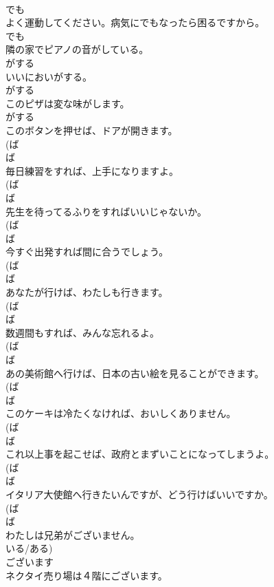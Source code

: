 \documentclass[8pt]{extreport}
\begin{document}
\begin{CJK}{UTF8}{min}
\\	でも
\\	よく運動してください。病気にでもなったら困るですから。	
\\	でも
\\	隣の家でピアノの音がしている。	
\\	がする
\\	いいにおいがする。	
\\	がする
\\	このピザは変な味がします。	
\\	がする
\\	このボタンを押せば、ドアが開きます。	
\\	(ば 
\\	ば
\\	毎日練習をすれば、上手になりますよ。	
\\	(ば 
\\	ば
\\	先生を待ってるふりをすればいいじゃないか。	
\\	(ば 
\\	ば
\\	今すぐ出発すれば間に合うでしょう。	
\\	(ば 
\\	ば
\\	あなたが行けば、わたしも行きます。	
\\	(ば 
\\	ば
\\	数週間もすれば、みんな忘れるよ。	
\\	(ば 
\\	ば
\\	あの美術館へ行けば、日本の古い絵を見ることができます。	
\\	(ば 
\\	ば
\\	このケーキは冷たくなければ、おいしくありません。	
\\	(ば 
\\	ば
\\	これ以上事を起こせば、政府とまずいことになってしまうよ。	
\\	(ば 
\\	ば
\\	イタリア大使館へ行きたいんですが、どう行けばいいですか。	
\\	(ば 
\\	ば
\\	わたしは兄弟がございません。	
\\	いる/ある)	
\\	ございます
\\	ネクタイ売り場は４階にございます。	

\end{CJK}
\end{document}
